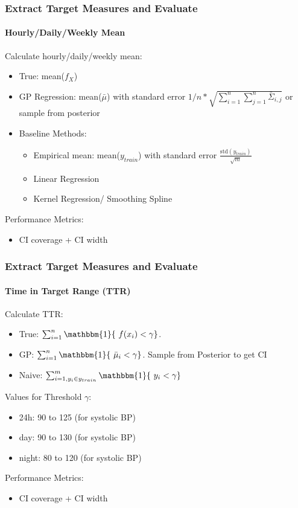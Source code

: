 \documentclass[
	8pt, %
]{beamer}
\begin{document}
\begin{frame}
	\frametitle{Extract Target Measures and Evaluate}
	\framesubtitle{Hourly/Daily/Weekly Mean} %

	Calculate hourly/daily/weekly mean:
	\begin{itemize}
		\item True: mean($f_{X}$)
		\item GP Regression: mean($\bar{\mu}$) with standard error
		$1 / n * \sqrt {\sum_{i=1}^{n}\sum_{j=1}^{n} \bar{\Sigma}_{i,j}}$ or sample from posterior
		\item Baseline Methods:
		\begin{itemize}
			\item Empirical mean: mean($y_{train}$) with standard error $\frac{\text{std}(y_{train})}{\sqrt{m}}$
			\item Linear Regression
			\item Kernel Regression/ Smoothing Spline
		\end{itemize}
	\end{itemize}

	\bigskip

	Performance Metrics:
	\begin{itemize}
		\item CI coverage + CI width
	\end{itemize}
\end{frame}


\begin{frame}
	\frametitle{Extract Target Measures and Evaluate}
	\framesubtitle{Time in Target Range (TTR)} %

	Calculate TTR:
	\begin{itemize}
			\item True: $\sum_{i=1}^{n} \mathbbm{1}\{\ f(x_i) < \gamma \}$.
			\item GP: $\sum_{i=1}^{n} \mathbbm{1}\{\ \bar{\mu}_i < \gamma \}$. Sample from Posterior to get CI
			\item Naive: $\sum_{i=1, y_i \in y_{train}}^{m} \mathbbm{1}\{\ y_i < \gamma \}$
	\end{itemize}


	\bigskip

	Values for Threshold $\gamma$:
	\begin{itemize}
		\item 24h: 90 to 125 (for systolic BP)
		\item day: 90 to 130 (for systolic BP)
		\item night: 80 to 120 (for systolic BP)
	\end{itemize}

	Performance Metrics:
	\begin{itemize}
		\item CI coverage + CI width
	\end{itemize}

\end{frame}
\end{document}

